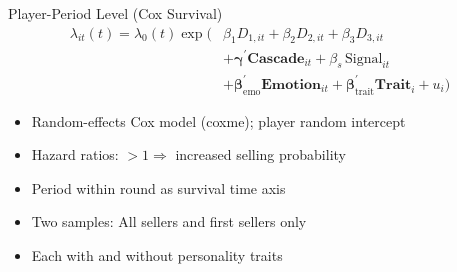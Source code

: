 \documentclass{beamer}
\begin{document}
\begin{frame}{Player-Period Level (Cox Survival)}
\vspace{-0.2cm}
\begin{equation*}
\begin{split}
    \lambda_{it}(t) = \lambda_0(t) \exp\bigl(
    & \beta_1 D_{1,it} + \beta_2 D_{2,it} + \beta_3 D_{3,it} \\
    & + \boldsymbol{\gamma}^{\prime} \mathbf{Cascade}_{it} + \beta_s \, \text{Signal}_{it} \\
    & + \boldsymbol{\beta}_{\text{emo}}^{\prime} \mathbf{Emotion}_{it} + \boldsymbol{\beta}_{\text{trait}}^{\prime} \mathbf{Trait}_i + u_i \bigr)
\end{split}
\end{equation*}

\begin{itemize}
    \item Random-effects Cox model (coxme); player random intercept
    \item Hazard ratios: $>1 \Rightarrow$ increased selling probability
    \item Period within round as survival time axis
    \item Two samples: All sellers and first sellers only
    \item Each with and without personality traits
\end{itemize}
\end{frame}
\end{document}
